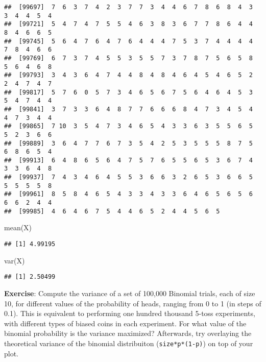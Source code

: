 \documentclass[
]{book}
\newenvironment{Shaded}{\begin{snugshade}}{\end{snugshade}}
\newcommand{\FunctionTok}[1]{\textcolor[rgb]{0.00,0.00,0.00}{#1}}
\newcommand{\NormalTok}[1]{#1}
\begin{document}
\begin{verbatim}
##  [99697]  7  6  3  7  4  2  3  7  7  3  4  4  6  7  8  6  8  4  3  3  4  4  5  4
##  [99721]  5  4  7  4  7  5  5  4  6  3  8  3  6  7  7  8  6  4  4  8  4  6  6  5
##  [99745]  5  6  4  7  6  4  7  6  4  4  4  7  5  3  7  4  4  4  4  7  8  4  6  6
##  [99769]  6  7  3  7  4  5  5  3  5  5  7  3  7  8  7  5  6  5  8  5  6  4  6  8
##  [99793]  3  4  3  6  4  7  4  4  8  4  8  4  6  4  5  4  6  5  2  2  4  7  4  7
##  [99817]  5  7  6  0  5  7  3  4  6  5  6  7  5  6  4  6  4  5  3  5  4  7  4  4
##  [99841]  3  7  3  3  6  4  8  7  7  6  6  6  8  4  7  3  4  5  4  4  7  3  4  4
##  [99865]  7 10  3  5  4  7  3  4  6  5  4  3  3  6  3  5  5  6  5  5  2  3  6  6
##  [99889]  3  6  4  7  7  6  7  3  5  4  2  5  3  5  5  5  8  7  5  6  8  6  5  4
##  [99913]  6  4  8  6  5  6  4  7  5  7  6  5  5  6  5  3  6  7  4  3  3  6  4  8
##  [99937]  7  4  3  4  6  4  5  5  3  6  6  3  2  6  5  3  6  6  5  5  5  5  5  8
##  [99961]  8  5  8  4  6  5  4  3  3  4  3  3  6  4  6  5  6  5  6  6  6  2  4  4
##  [99985]  4  6  4  6  7  5  4  4  6  5  2  4  4  5  6  5
\end{verbatim}

\begin{Shaded}
\begin{Highlighting}[]
\FunctionTok{mean}\NormalTok{(X)}
\end{Highlighting}
\end{Shaded}

\begin{verbatim}
## [1] 4.99195
\end{verbatim}

\begin{Shaded}
\begin{Highlighting}[]
\FunctionTok{var}\NormalTok{(X)}
\end{Highlighting}
\end{Shaded}

\begin{verbatim}
## [1] 2.50499
\end{verbatim}

\textbf{Exercise}: Compute the variance of a set of 100,000 Binomial trials, each of size 10, for different values of the probability of heads, ranging from 0 to 1 (in steps of 0.1). This is equivalent to performing one hundred thousand 5-toss experiments, with different types of biased coins in each experiment. For what value of the binomial probability is the variance maximized? Afterwards, try overlaying the theoretical variance of the binomial distribuiton (\texttt{size*p*(1-p)}) on top of your plot.
\end{document}
